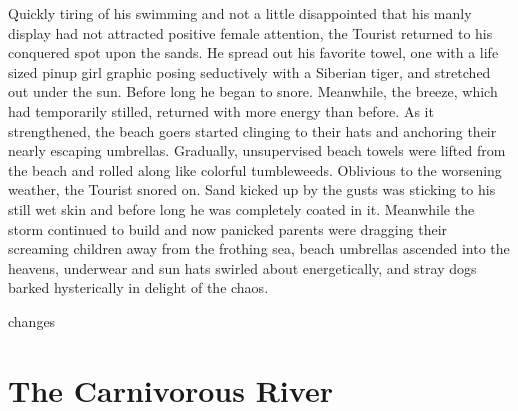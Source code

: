 \documentclass[10pt,twoside,openright]{memoir}
\begin{document}
Quickly tiring of his swimming and not a little disappointed that his manly display had not attracted positive female attention, the Tourist returned to his conquered spot upon the sands. He spread out his favorite towel, one with a life sized pinup girl graphic posing seductively with a Siberian tiger, and stretched out under the sun. Before long he began to snore. Meanwhile, the breeze, which had temporarily stilled, returned with more energy than before. As it strengthened, the beach goers started clinging to their hats and anchoring their nearly escaping umbrellas. Gradually, unsupervised beach towels were lifted from the beach and rolled along like colorful tumbleweeds. Oblivious to the worsening weather, the Tourist snored on. Sand kicked up by the gusts was sticking to his still wet skin and before long he was completely coated in it. Meanwhile the storm continued to build and now panicked parents were dragging their screaming children away from the frothing sea, beach umbrellas ascended into the heavens, underwear and sun hats swirled about energetically, and stray dogs barked hysterically in delight of the chaos.

changes



\chapter{The Carnivorous River}

\end{document}
